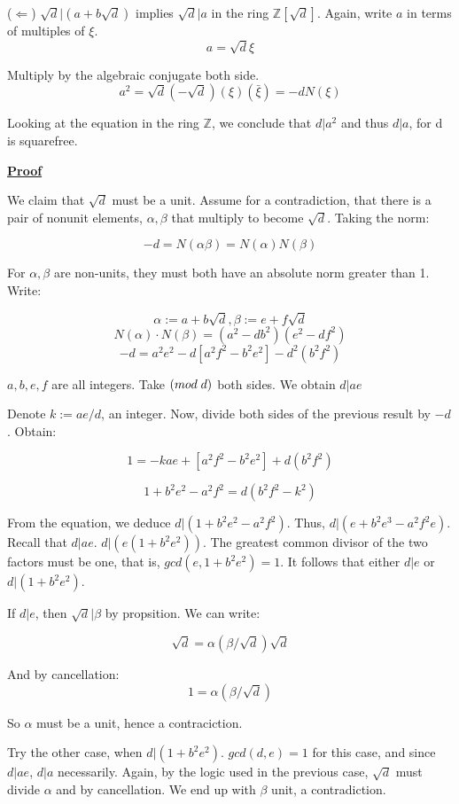\documentclass{article}
\def\_{{\hspace{1mm}}}
\def\contradiction{{\lightning}}
\newcommand{\Proof}{{
    \vspace{2mm}
    \noindent
    \textbf{
    \underline{Proof}}
}
}
\begin{document}
($\Leftarrow$) 
$\sqrt{d}|(a+b\sqrt{d})$ implies
$\sqrt{d}|a$ in the ring $\mathbb{Z}[\sqrt{d}]$. Again, write $a$ in terms 
of multiples of $\xi$. 
\[
    a = \sqrt{d}\xi
\]

Multiply by the algebraic conjugate both side.
\[
    a^2 = \sqrt{d}(-\sqrt{d})(\xi)(\bar{\xi}) = -dN(\xi)
\]

Looking at the equation in the ring $\mathbb{Z}$,
we conclude that $d|a^2$ and thus $d|a$, for d is squarefree. 

\Proof
We claim that $\sqrt{d}$ must be a unit. Assume for a contradiction,
that there is a pair of nonunit elements, $\alpha, \beta$ that 
multiply to become $\sqrt{d}$. Taking the norm:

\[
    -d = N(\alpha \beta) = N(\alpha) N(\beta)
\]

For $\alpha, \beta$ are non-units, they must both have an absolute 
norm greater than 1. Write:

\[
    \alpha := a + b\sqrt{d}, \beta := e+f\sqrt{d}
\]
\[
    N(\alpha)\cdot N(\beta) = (a^2-db^2)(e^2-df^2)
\]
\[
    -d = a^2e^2-d[a^2f^2-b^2e^2]-d^2(b^2f^2)
\]

$a, b, e, f$ are all integers. Take $(mod \_ d)$ both sides. We obtain $d|ae$

Denote $k:= ae/d$, an integer. Now, divide both sides of the previous 
result by $-d$. Obtain:

\[
    1 = -kae+[a^2f^2-b^2e^2]+d(b^2f^2)
\]

\[
    1+b^2e^2-a^2f^2 = d(b^2f^2-k^2)
\]

From the equation, we deduce $d|(1+b^2e^2-a^2f^2)$. Thus, 
$d|(e+b^2e^3-a^2f^2e)$. Recall that $d|ae$. 
$d|(e(1+b^2e^2))$. The greatest common divisor of the two 
factors must be one, that is, $gcd(e, 1+b^2e^2) = 1$. It follows 
that either $d|e$ or $d|(1+b^2e^2)$. 

If $d|e$, then $\sqrt{d}|\beta$ by propsition. We can write:

\[
    \sqrt{d} = \alpha (\beta/\sqrt{d})\sqrt{d}
\]

And by cancellation:
\[
    1 = \alpha (\beta/\sqrt{d})
\]

So $\alpha$ must be a unit, hence a contraciction. 

Try the other case, when $d|(1+b^2e^2)$. $gcd(d, e) = 1$ for this case, 
and since $d|ae$, $d|a$ necessarily. Again, by the logic used in the previous 
case, $\sqrt{d}$ must divide $\alpha$ and by cancellation. We end up with 
$\beta$ unit, a contradiction. \contradiction 
\end{document}
